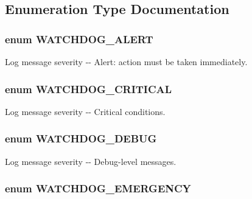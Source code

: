 \subsection{Enumeration Type Documentation}
\hypertarget{group__logging__severity__levels_ga9fdd40d55b14109f09f091f401f237c0}{
\subsubsection[{WATCHDOG\_\-ALERT}]{\setlength{\rightskip}{0pt plus 5cm}enum {\bf WATCHDOG\_\-ALERT}}}
\label{group__logging__severity__levels_ga9fdd40d55b14109f09f091f401f237c0}
Log message severity -\/-\/ Alert: action must be taken immediately. \hypertarget{group__logging__severity__levels_gab4129b98c8480bea3cbcd62083ae81e3}{
\subsubsection[{WATCHDOG\_\-CRITICAL}]{\setlength{\rightskip}{0pt plus 5cm}enum {\bf WATCHDOG\_\-CRITICAL}}}
\label{group__logging__severity__levels_gab4129b98c8480bea3cbcd62083ae81e3}
Log message severity -\/-\/ Critical conditions. \hypertarget{group__logging__severity__levels_gaf672cd38d5654f8a4a12e32d9b9e749d}{
\subsubsection[{WATCHDOG\_\-DEBUG}]{\setlength{\rightskip}{0pt plus 5cm}enum {\bf WATCHDOG\_\-DEBUG}}}
\label{group__logging__severity__levels_gaf672cd38d5654f8a4a12e32d9b9e749d}
Log message severity -\/-\/ Debug-\/level messages. \hypertarget{group__logging__severity__levels_ga467e941228edf3b033b5ef460e1bfcf7}{
\subsubsection[{WATCHDOG\_\-EMERGENCY}]{\setlength{\rightskip}{0pt plus 5cm}enum {\bf WATCHDOG\_\-EMERGENCY}}}
